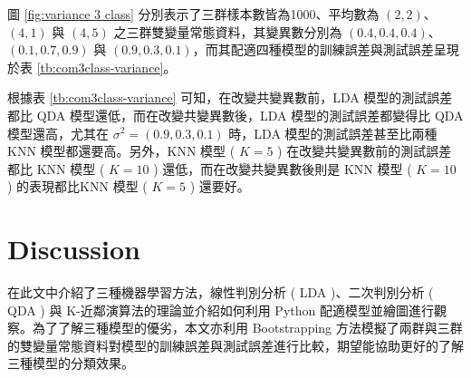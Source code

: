 \begin{itemize}
圖 \ref{fig:variance 3 class} 分別表示了三群樣本數皆為1000、平均數為 $(2,2)$、$(4,1)$ 與 $(4,5)$ 之三群雙變量常態資料，其變異數分別為 $(0.4,0.4,0.4)$、$(0.1,0.7,0.9)$ 與 $(0.9,0.3,0.1)$，而其配適四種模型的訓練誤差與測試誤差呈現於表 \ref{tb:com3class-variance}。

\renewcommand\arraystretch{1.5}
\begin{table}[h]
\scriptsize
\setlength{\belowcaptionskip}{0pt}
\centering
\caption{Error Rate of three Methods of changing variance for three classes}\label{tb:com3class-variance}
\end{table}

\end{itemize}

根據表 \ref{tb:com3class-variance} 可知，在改變共變異數前，LDA 模型的測試誤差都比 QDA 模型還低，而在改變共變異數後，LDA 模型的測試誤差都變得比 QDA 模型還高，尤其在 $\sigma^{2}=(0.9, 0.3, 0.1)$ 時，LDA 模型的測試誤差甚至比兩種 KNN 模型都還要高。另外，KNN 模型 ( $K=5$ ) 在改變共變異數前的測試誤差都比 KNN 模型 ( $K=10$ ) 還低，而在改變共變異數後則是 KNN 模型 ( $K=10$ ) 的表現都比KNN 模型 ( $K=5$ ) 還要好。


\section{Discussion}

在此文中介紹了三種機器學習方法，線性判別分析 ( LDA )、二次判別分析 ( QDA ) 與 K-近鄰演算法的理論並介紹如何利用 Python 配適模型並繪圖進行觀察。為了了解三種模型的優劣，本文亦利用 Bootstrapping 方法模擬了兩群與三群的雙變量常態資料對模型的訓練誤差與測試誤差進行比較，期望能協助更好的了解三種模型的分類效果。

